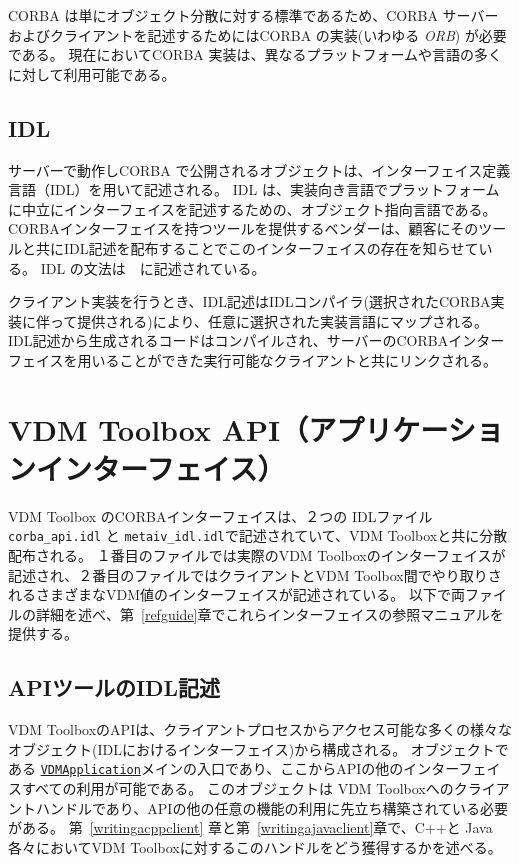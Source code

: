 \documentclass[\pformat,12pt]{jarticle}
\newcommand{\VDMApplication}{\hyperlink{interface.VDMApplication}{VDMApplication}}
\begin{document}
 CORBA は単にオブジェクト分散に対する標準であるため、CORBA サーバーおよびクライアントを記述するためにはCORBA の実装(いわゆる {\em ORB}) が必要である。
現在においてCORBA 実装は、異なるプラットフォームや言語の多くに対して利用可能である。  

\subsection{IDL}

サーバーで動作しCORBA で公開されるオブジェクトは、インターフェイス定義言語（IDL）を用いて記述される。
IDL は、実装向き言語でプラットフォームに中立にインターフェイスを記述するための、オブジェクト指向言語である。
CORBAインターフェイスを持つツールを提供するベンダーは、顧客にそのツールと共にIDL記述を配布することでこのインターフェイスの存在を知らせている。
IDL の文法は　\cite{OMG&96}に記述されている。 

クライアント実装を行うとき、IDL記述はIDLコンパイラ(選択されたCORBA実装に伴って提供される)により、任意に選択された実装言語にマップされる。
 IDL記述から生成されるコードはコンパイルされ、サーバーのCORBAインターフェイスを用いることができた実行可能なクライアントと共にリンクされる。

\newpage
\section{VDM Toolbox API（アプリケーションインターフェイス）} 
\label{Toolboxapi}

VDM Toolbox のCORBAインターフェイスは、２つの IDLファイル {\tt corba\_api.idl} と {\tt metaiv\_idl.idl}で記述されていて、VDM Toolboxと共に分散配布される。
１番目のファイルでは実際のVDM Toolboxのインターフェイスが記述され、２番目のファイルではクライアントとVDM Toolbox間でやり取りされるさまざまなVDM値のインターフェイスが記述されている。
以下で両ファイルの詳細を述べ、第~\ref{refguide}章でこれらインターフェイスの参照マニュアルを提供する。

\subsection{APIツールのIDL記述}
\label{idldescriptiontool}

VDM ToolboxのAPIは、クライアントプロセスからアクセス可能な多くの様々なオブジェクト(IDLにおけるインターフェイス)から構成される。
オブジェクトである {\tt  \VDMApplication}メインの入口であり、ここからAPIの他のインターフェイスすべての利用が可能である。
このオブジェクトは VDM Toolboxへのクライアントハンドルであり、APIの他の任意の機能の利用に先立ち構築されている必要がある。
第~\ref{writingacppclient} 章と第~\ref{writingajavaclient}章で、C++と Java各々においてVDM Toolboxに対するこのハンドルをどう獲得するかを述べる。
\end{document}
